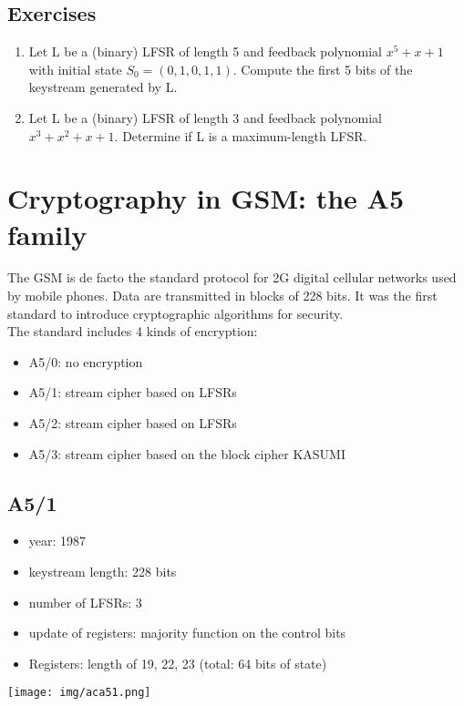 \documentclass[a4paper, 10pt, titlepage]{article}
\begin{document}
\subsection*{Exercises}
\begin{enumerate}
\item Let L be a (binary) LFSR of length 5 and feedback polynomial
$x^5 + x + 1$ with initial state $S_0 = (0, 1, 0, 1, 1)$. Compute the first 5 bits of the keystream generated by L.
\item Let L be a (binary) LFSR of length 3 and feedback polynomial
$x^3 + x^2 + x + 1$. Determine if L is a maximum-length LFSR.
\end{enumerate}
\newpage

\section{Cryptography in GSM: the A5 family}
The GSM is de facto the standard protocol for 2G digital cellular
networks used by mobile phones. Data are transmitted in blocks of 228 bits. It was the first standard to introduce cryptographic algorithms for security. \\The standard includes 4 kinds of encryption:
\begin{itemize}
\item A5/0: no encryption
\item A5/1: stream cipher based on LFSRs
\item A5/2: stream cipher based on LFSRs
\item A5/3: stream cipher based on the block cipher KASUMI
\end{itemize}

\subsection{A5/1}
\begin{itemize}
\item year: 1987
\item keystream length: 228 bits
\item number of LFSRs: 3
\item update of registers: majority function on the control bits
\item Registers: length of 19, 22, 23 (total: 64 bits of state)
\end{itemize}
\begin{center}
\texttt{[image: img/aca51.png]}
\end{center}
\end{document}
